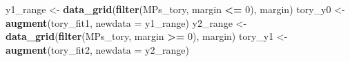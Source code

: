 \documentclass[]{book}
\newenvironment{Shaded}{\begin{snugshade}}{\end{snugshade}}
\newcommand{\KeywordTok}[1]{\textcolor[rgb]{0.13,0.29,0.53}{\textbf{#1}}}
\newcommand{\DataTypeTok}[1]{\textcolor[rgb]{0.13,0.29,0.53}{#1}}
\newcommand{\DecValTok}[1]{\textcolor[rgb]{0.00,0.00,0.81}{#1}}
\newcommand{\StringTok}[1]{\textcolor[rgb]{0.31,0.60,0.02}{#1}}
\newcommand{\OperatorTok}[1]{\textcolor[rgb]{0.81,0.36,0.00}{\textbf{#1}}}
\newcommand{\NormalTok}[1]{#1}
\theoremstyle{definition}
\theoremstyle{definition}
\theoremstyle{definition}
\theoremstyle{remark}
\begin{document}
\begin{Shaded}
\begin{Highlighting}[]
\NormalTok{y1_range <-}\StringTok{ }\KeywordTok{data_grid}\NormalTok{(}\KeywordTok{filter}\NormalTok{(MPs_tory, margin }\OperatorTok{<=}\StringTok{ }\DecValTok{0}\NormalTok{), margin)}
\NormalTok{tory_y0 <-}\StringTok{ }\KeywordTok{augment}\NormalTok{(tory_fit1, }\DataTypeTok{newdata =}\NormalTok{ y1_range)}
\NormalTok{y2_range <-}\StringTok{ }\KeywordTok{data_grid}\NormalTok{(}\KeywordTok{filter}\NormalTok{(MPs_tory, margin }\OperatorTok{>=}\StringTok{ }\DecValTok{0}\NormalTok{), margin)}
\NormalTok{tory_y1 <-}\StringTok{ }\KeywordTok{augment}\NormalTok{(tory_fit2, }\DataTypeTok{newdata =}\NormalTok{ y2_range)}
\end{Highlighting}
\end{Shaded}
\end{document}
